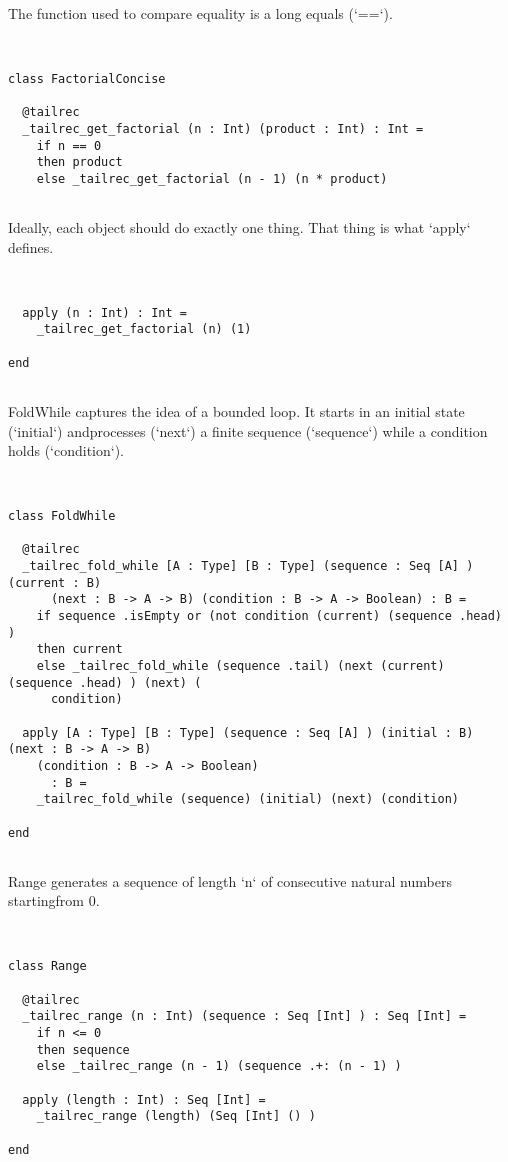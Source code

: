 \documentclass[12pt,a4paper]{article}
\begin{document}
The function used to compare equality is a long equals (`==`). 


\begin{lstlisting}


class FactorialConcise

  @tailrec
  _tailrec_get_factorial (n : Int) (product : Int) : Int =
    if n == 0
    then product
    else _tailrec_get_factorial (n - 1) (n * product)


\end{lstlisting}

Ideally, each object should do exactly one thing. That thing is what `apply` defines. 


\begin{lstlisting}


  apply (n : Int) : Int =
    _tailrec_get_factorial (n) (1)

end


\end{lstlisting}

FoldWhile captures the idea of a bounded loop. It starts in an initial state (`initial`) andprocesses (`next`) a finite sequence (`sequence`) while a condition holds (`condition`). 


\begin{lstlisting}


class FoldWhile

  @tailrec
  _tailrec_fold_while [A : Type] [B : Type] (sequence : Seq [A] ) (current : B)
      (next : B -> A -> B) (condition : B -> A -> Boolean) : B =
    if sequence .isEmpty or (not condition (current) (sequence .head) )
    then current
    else _tailrec_fold_while (sequence .tail) (next (current) (sequence .head) ) (next) (
      condition)

  apply [A : Type] [B : Type] (sequence : Seq [A] ) (initial : B) (next : B -> A -> B)
    (condition : B -> A -> Boolean)
      : B =
    _tailrec_fold_while (sequence) (initial) (next) (condition)

end


\end{lstlisting}

Range generates a sequence of length `n` of consecutive natural numbers startingfrom 0. 


\begin{lstlisting}


class Range

  @tailrec
  _tailrec_range (n : Int) (sequence : Seq [Int] ) : Seq [Int] =
    if n <= 0
    then sequence
    else _tailrec_range (n - 1) (sequence .+: (n - 1) )

  apply (length : Int) : Seq [Int] =
    _tailrec_range (length) (Seq [Int] () )

end


\end{lstlisting}
\end{document}
